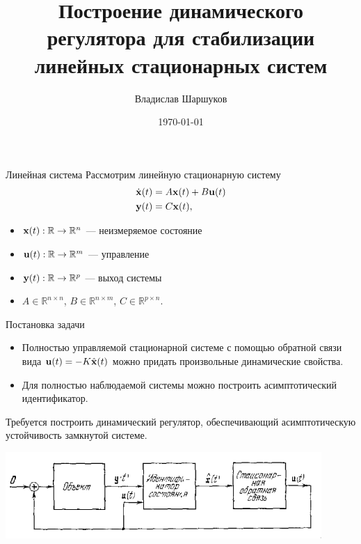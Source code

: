 \documentclass[notheorems,aspectratio=169]{beamer}
\author{Владислав Шаршуков}
\date{\today}
\title{Построение динамического регулятора для стабилизации линейных стационарных систем}
\theoremstyle{definition}
\begin{document}
\begin{frame}
  \titlepage{}
\end{frame}

\begin{frame}{Линейная система}
  Рассмотрим линейную стационарную систему
  \begin{equation*}
    \begin{aligned}
      \dot{\vb{x}}(t) &= A \vb{x}(t) + B \vb{u}(t) \\
      \vb{y}(t) &= C \vb{x}(t),
    \end{aligned}
  \end{equation*}

  \begin{itemize}
  \item $\vb{x}(t): \mathbb{R} \to \mathbb{R}^n$ --- неизмеряемое состояние
  \item $\vb{u}(t): \mathbb{R} \to \mathbb{R}^m$ --- управление
  \item $\vb{y}(t): \mathbb{R} \to \mathbb{R}^p$ --- выход системы
  \item $A \in \mathbb{R}^{n \times n}$, $B \in \mathbb{R}^{n \times m}$, $C \in \mathbb{R}^{p \times n}$.
  \end{itemize}
\end{frame}

\begin{frame}{Постановка задачи}
  \begin{itemize}
  \item Полностью управляемой стационарной системе с помощью обратной связи
    вида $\vb{u}(t) = -K\hat{\vb{x}}(t)$ можно придать произвольные динамические
    свойства.~\cite{Andreev1976}

  \item Для полностью наблюдаемой системы можно построить асимптотический идентификатор.~\cite{Andreev1976,Smirnov2022}
  \end{itemize}

  Требуется построить динамический регулятор, обеспечивающий асимптотическую устойчивость замкнутой системе.

  \begin{center}
    \includegraphics[width=12cm]{Regulator}
  \end{center}
\end{frame}
\end{document}
